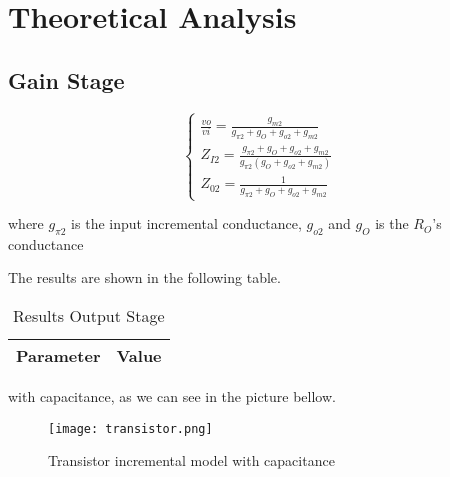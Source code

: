 \section{Theoretical Analysis} \label{sec:analysis}
 


\subsection{Gain Stage}



\begin{equation}
 \begin{cases}
 \frac{vo}{vi}=\frac{g_{m2}}{g_{\pi 2}+g_O+g_{o2}+g_{m2}}\\
  Z_{I2}=\frac{g_{\pi 2}+g_O+g_{o2}+g_{m2}}{g_{\pi 2}(g_O+g_{o2}+g_{m2})}\\
  Z_{02}=\frac{1}{g_{\pi 2}+g_O+g_{o2}+g_{m2}}
 \end{cases}
\end{equation}

where $g_{\pi 2}$ is the input incremental conductance, $g_{o 2}$ and $g_O$ is the $R_O$'s conductance


The results are shown in the following table.

\begin{table}[!htb]
\centering
  \begin{tabular}{|c|c|}
    \hline    
    {\bf Parameter} & {\bf Value} \\ \hline
    
 \end{tabular}
 \caption{Results Output Stage}\label{tab:outputstage}
\end{table}
 with capacitance, as we can see in the picture bellow.
 
 \begin{figure}[h] \centering
\texttt{[image: transistor.png]}
\vspace{-3mm}
\caption{Transistor incremental model with capacitance}\label{fig:rc}
\end{figure}



\newpage
